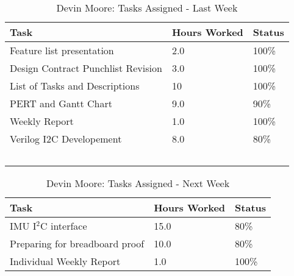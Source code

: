 \documentclass[12pt,compsoc]{IEEEtran}
\begin{document}
	\begin{table}[ht]
	\renewcommand{\arraystretch}{1.3}
		\caption{Devin Moore: Tasks Assigned - Last Week}
		
		\label{Summary of Devin Moore's activities: last week}
		
		\centering
		\begin{tabular}{p{5.5cm}|p{1cm}|p{1cm}}

		\hline
		\bfseries 	Task		 		                    & \bfseries Hours Worked	& \bfseries Status	\\
		\hline\hline
					Feature list presentation 				& 2.0 						& 100\%				\\
					Design Contract Punchlist Revision		& 3.0 						& 100\%				\\
					List of Tasks and Descriptions			&10 						& 100\%				\\
					PERT and Gantt Chart					&9.0 						& 90\%				\\
					Weekly Report							&1.0 						& 100\%				\\
					Verilog I2C Developement				&8.0						& 80\%				\\
		\hline\
		\end{tabular}
	\end{table}

	\begin{table}[ht]
	\renewcommand{\arraystretch}{1.3}
		\caption{Devin Moore: Tasks Assigned - Next Week}
		
		\label{Summary of Devin Moore's activites: this week}
		
		\centering
		\begin{tabular}{p{5.5cm}|p{1cm}|p{1cm}}

		\hline
		\bfseries 	Task		 		            & \bfseries Hours Worked	& \bfseries Status	\\
		\hline\hline
                    IMU I$^2$C interface            & 15.0                      & 80\%              \\
                    Preparing for breadboard proof  & 10.0                      & 80\%              \\
                    Individual Weekly Report		& 1.0 						& 100\% 			\\
                    \hline
		\end{tabular}
	\end{table}

\end{document}
